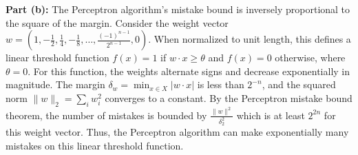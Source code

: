 \documentclass[11pt]{article}
\DeclareMathOperator{\1}{\mathbbm{1}}
\begin{document}
\begin{problem}[15 points]
\textbf{Part (b):} The Perceptron algorithm's mistake bound is inversely proportional to the square of the margin. Consider the weight vector $w = \left(1, -\frac{1}{2}, \frac{1}{4}, -\frac{1}{8}, \ldots, \frac{(-1)^{n-1}}{2^{n-1}}, 0\right)$. When normalized to unit length, this defines a linear threshold function $f(x) = 1$ if $w \cdot x \geq \theta$ and $f(x) = 0$ otherwise, where $\theta = 0$. For this function, the weights alternate signs and decrease exponentially in magnitude. The margin $\delta_w = \min_{x \in X} |w \cdot x|$ is less than $2^{-n}$, and the squared norm $\|w\|_2 = \sum_i w_i^2$ converges to a constant. By the Perceptron mistake bound theorem, the number of mistakes is bounded by $\frac{\|w\|^2}{\delta_2^2}$ which is at least $2^{2n}$ for this weight vector. Thus, the Perceptron algorithm can make exponentially many mistakes on this linear threshold function.
\end{problem}
\end{document}
